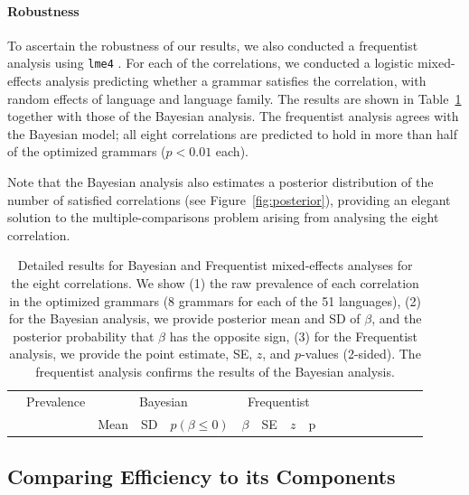 \documentclass[10pt,twoside,lineno]{article}
\begin{document}
\paragraph{Robustness}
To ascertain the robustness of our results, we also conducted a frequentist analysis using \texttt{lme4} \cite{bates2015fitting}.
For each of the correlations, we conducted a logistic mixed-effects analysis predicting whether a grammar satisfies the correlation, with random effects of language and language family.
The results are shown in Table~\ref{tab:corr-regression} together with those of the Bayesian analysis.
The frequentist analysis agrees with the Bayesian model; all eight correlations are predicted to hold in more than half of the optimized grammars ($p < 0.01$ each).

Note that the Bayesian analysis  also estimates a posterior distribution of the number of satisfied correlations (see Figure~\ref{fig:posterior}), providing an elegant solution to the multiple-comparisons problem arising from analysing the eight correlation.



\begin{table}
\small{
\begin{center}
\begin{tabular}{|l||l|lll|llll|ll|llllll}
\hline
 & Prevalence & \multicolumn{3}{c|}{Bayesian} & \multicolumn{4}{c|}{Frequentist} \\ 
& & Mean & SD & $p(\beta \leq 0)$ & $\beta$ & SE & $z$ & p \\
\hline\hline
	
\hline
\end{tabular}
\end{center}
}
	\caption{Detailed results for Bayesian and Frequentist mixed-effects analyses for the eight correlations. 
We show (1) the raw prevalence of each correlation in the optimized grammars (8 grammars for each of the 51 languages),
(2) for the Bayesian analysis, we provide posterior mean and SD of $\beta$, and the posterior probability that $\beta$ has the opposite sign,
(3) for the Frequentist analysis, we provide the point estimate, SE, $z$, and $p$-values (2-sided).
The frequentist analysis confirms the results of the Bayesian analysis.
}\label{tab:corr-regression}
\end{table}





\subsection{Comparing Efficiency to its Components}\label{sec:posterior-number}
\end{document}
